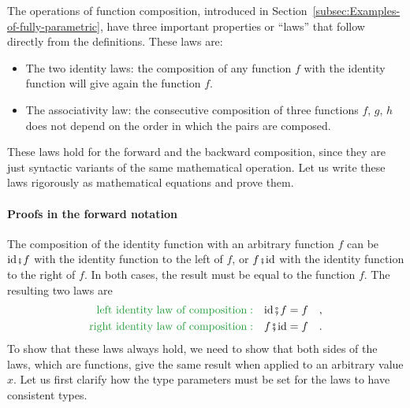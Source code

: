The operations of function composition, introduced in Section~\ref{subsec:Examples-of-fully-parametric},
have three important properties or ``laws'' that follow directly
from the definitions. These laws are:
\begin{itemize}
\item The two identity laws: the composition of any function $f$ with the
identity function will give again the function $f$.
\item The associativity law: the consecutive composition of three functions
$f$, $g$, $h$ does not depend on the order in which the pairs are
composed.
\end{itemize}
These laws hold for the forward and the backward composition, since
they are just syntactic variants of the same mathematical operation.
Let us write these laws rigorously as mathematical equations and prove
them.

\paragraph{Proofs in the forward notation}

The composition of the identity function with an arbitrary function
$f$ can be $\text{id}\bef f$ with the identity function to the left
of $f$, or $f\bef\text{id}$ with the identity function to the right
of $f$. In both cases, the result must be equal to the function $f$.
The resulting two laws are
\begin{align*}
{\color{greenunder}\text{left identity law of composition}:}\quad & \text{id}\bef f=f\quad,\\
{\color{greenunder}\text{right identity law of composition}:}\quad & f\bef\text{id}=f\quad.
\end{align*}
To show that these laws always hold, we need to show that both sides
of the laws, which are functions, give the same result when applied
to an arbitrary value $x$. Let us first clarify how the type parameters
must be set for the laws to have consistent types.

